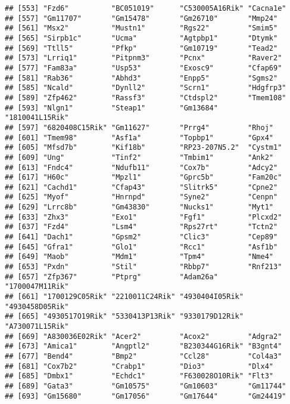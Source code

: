 \documentclass[
]{article}
\begin{document}
\begin{verbatim}
## [553] "Fzd6"          "BC051019"      "C530005A16Rik" "Cacna1e"      
## [557] "Gm11707"       "Gm15478"       "Gm26710"       "Mmp24"        
## [561] "Msx2"          "Mustn1"        "Rgs22"         "Smim5"        
## [565] "Sirpb1c"       "Ucma"          "Agtpbp1"       "Dtymk"        
## [569] "Ttll5"         "Pfkp"          "Gm10719"       "Tead2"        
## [573] "Lrriq1"        "Pitpnm3"       "Pcnx"          "Raver2"       
## [577] "Fam83a"        "Usp53"         "Exosc9"        "Cfap69"       
## [581] "Rab36"         "Abhd3"         "Enpp5"         "Sgms2"        
## [585] "Ncald"         "Dynll2"        "Scrn1"         "Hdgfrp3"      
## [589] "Zfp462"        "Rassf3"        "Ctdspl2"       "Tmem108"      
## [593] "Nlgn1"         "Steap1"        "Gm13684"       "1810041L15Rik"
## [597] "6820408C15Rik" "Gm11627"       "Prrg4"         "Rhoj"         
## [601] "Tmem98"        "Asf1a"         "Topbp1"        "Gpx4"         
## [605] "Mfsd7b"        "Kif18b"        "RP23-207N5.2"  "Cystm1"       
## [609] "Ung"           "Tinf2"         "Tmbim1"        "Ank2"         
## [613] "Fndc4"         "Ndufb11"       "Cox7b"         "Adcy2"        
## [617] "H60c"          "Mpzl1"         "Gprc5b"        "Fam20c"       
## [621] "Cachd1"        "Cfap43"        "Slitrk5"       "Cpne2"        
## [625] "Myof"          "Hnrnpd"        "Syne2"         "Cenpn"        
## [629] "Lrrc8b"        "Gm43830"       "Nucks1"        "Myt1"         
## [633] "Zhx3"          "Exo1"          "Fgf1"          "Plcxd2"       
## [637] "Fzd4"          "Lsm4"          "Rps27rt"       "Tctn2"        
## [641] "Dach1"         "Gpsm2"         "Clic3"         "Cep89"        
## [645] "Gfra1"         "Glo1"          "Rcc1"          "Asf1b"        
## [649] "Maob"          "Mdm1"          "Tpm4"          "Nme4"         
## [653] "Pxdn"          "Stil"          "Rbbp7"         "Rnf213"       
## [657] "Zfp367"        "Ptprg"         "Adam26a"       "1700047M11Rik"
## [661] "1700129C05Rik" "2210011C24Rik" "4930404I05Rik" "4930458D05Rik"
## [665] "4930517O19Rik" "5330413P13Rik" "9330179D12Rik" "A730071L15Rik"
## [669] "A830036E02Rik" "Acer2"         "Acox2"         "Adgra2"       
## [673] "Amica1"        "Angptl2"       "B230344G16Rik" "B3gnt4"       
## [677] "Bend4"         "Bmp2"          "Ccl28"         "Col4a3"       
## [681] "Cox7b2"        "Crabp1"        "Dio3"          "Dlx4"         
## [685] "Dmbx1"         "Echdc1"        "F630028O10Rik" "Flt3"         
## [689] "Gata3"         "Gm10575"       "Gm10603"       "Gm11744"      
## [693] "Gm15680"       "Gm17056"       "Gm17644"       "Gm24419"      

\end{verbatim}
\end{document}
